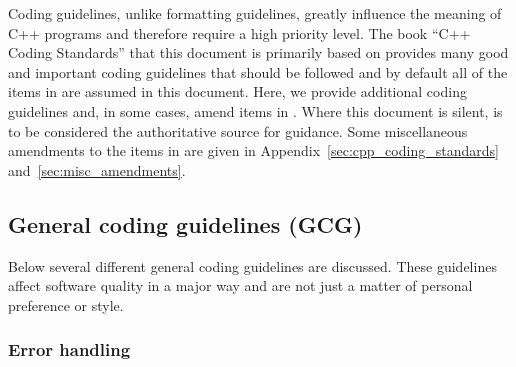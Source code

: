 Coding guidelines, unlike formatting guidelines, greatly influence the
meaning of C++ programs and therefore require a high priority level.
The book ``C++ Coding Standards'' {}\cite{C++CodingStandards05} that
this document is primarily based on provides many good and important
coding guidelines that should be followed and by default all of the
items in {}\cite{C++CodingStandards05} are assumed in this document.
Here, we provide additional coding guidelines and, in some cases,
amend items in {}\cite{C++CodingStandards05}.  Where this document is
silent, {}\cite{C++CodingStandards05} is to be considered the
authoritative source for guidance.  Some miscellaneous amendments to
the items in {}\cite{C++CodingStandards05} are given in
Appendix~\ref{sec:cpp_coding_standards} and~\ref{sec:misc_amendments}.


%
\subsection{General coding guidelines (GCG)}
%

Below several different general coding guidelines are discussed.  These
guidelines affect software quality in a major way and are not just a matter of
personal preference or style.

%
\subsubsection{Error handling}
%


